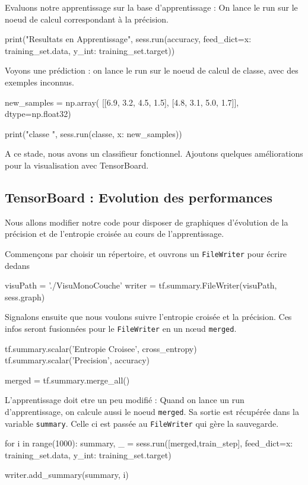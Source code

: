 \documentclass[a4paper,11pt]{book}
\begin{document}
Evaluons notre apprentissage sur la base d'apprentissage : On lance le run sur le noeud de calcul correspondant à la précision. 
\begin{mypython}
print("Resultats en Apprentissage", sess.run(accuracy, feed_dict={x: training_set.data, y_int: training_set.target}))
\end{mypython}

Voyons une prédiction : on lance le run sur le noeud de calcul de classe, avec des exemples inconnus.
\begin{mypython}
new_samples = np.array(
  [[6.9, 3.2, 4.5, 1.5],
   [4.8, 3.1, 5.0, 1.7]], dtype=np.float32)
  
print("classe ", sess.run(classe, {x: new_samples}))
\end{mypython}

A ce stade, nous avons un classifieur fonctionnel.
Ajoutons quelques améliorations pour la visualisation avec TensorBoard.

\subsection{TensorBoard : Evolution des performances}
\label{sec:irisMonocoucheTensorBoard}
Nous allons modifier notre code pour disposer de graphiques d'évolution de la précision et de l'entropie croisée au cours de l'apprentissage.

Commençons par choisir un répertoire, et ouvrons un \verb+FileWriter+ pour écrire dedans
\begin{mypython}
visuPath = './VisuMonoCouche'
writer = tf.summary.FileWriter(visuPath, sess.graph)
\end{mypython}

Signalons ensuite que nous voulons suivre l'entropie croisée et la précision. Ces infos seront fusionnées pour le \verb+FileWriter+ en un nœud \verb+merged+.
\begin{mypython}
tf.summary.scalar('Entropie Croisee', cross_entropy)
tf.summary.scalar('Precision', accuracy)

merged = tf.summary.merge_all()
\end{mypython}

L'apprentissage doit etre un peu modifié : Quand on lance un run d'apprentissage, on calcule aussi le noeud \verb+merged+. Sa sortie est récupérée dans la variable \verb+summary+. Celle ci est passée au \verb+FileWriter+ qui gère la sauvegarde.
\begin{mypython}
for i in range(1000):
  summary, _ = sess.run([merged,train_step], feed_dict={x: training_set.data, y_int: training_set.target})

  writer.add_summary(summary, i)
\end{mypython}
\end{document}
